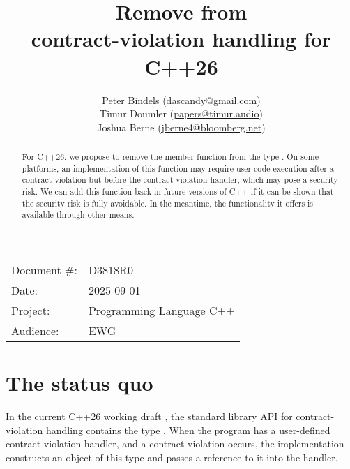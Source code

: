 

 \usepackage[bottom]{footmisc} 



\title{Remove  from \\ contract-violation handling for C++26}
\author{
  Peter Bindels \small(\href{mailto:dascandy@gmail.com}{dascandy@gmail.com}) \\
  Timur Doumler \small(\href{mailto:papers@timur.audio}{papers@timur.audio}) \\
  Joshua Berne \small(\href{mailto:jberne4@bloomberg.net}{jberne4@bloomberg.net}) \\
}
\date{}
\maketitle

\begin{tabular}{ll}
Document \#: & D3818R0 \\
Date: &2025-09-01 \\
Project: & Programming Language C++ \\
Audience: & EWG
\end{tabular}

\begin{abstract}
For C++26, we propose to remove the member function  from the type . On some platforms, an implementation of this function may require user code execution after a contract violation but before the contract-violation handler, which may pose a security risk. We can add this function back in future versions of C++ if it can be shown that the security risk is fully avoidable. In the meantime, the functionality it offers is available through other means.
\end{abstract}


\section{The status quo}

In the current C++26 working draft \cite{N5014}, the standard library API for contract-violation handling contains the type . When the program has a user-defined contract-violation handler, and a contract violation occurs, the implementation constructs an object of this type and passes a reference to it into the handler.

